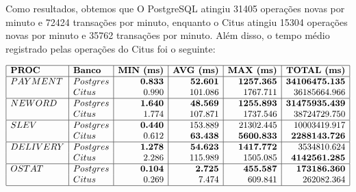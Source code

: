 Como resultados, obtemos que O PostgreSQL atingiu 31405 operações novas por minuto e 72424 transações por minuto, 
enquanto o Citus atingiu 15304 operações novas por minuto e 35762 transações por minuto.
Além disso, o tempo médio registrado pelas operações do Citus foi o seguinte:

\[
\begin{array}{|l|l|r|r|r|r|}
\hline
\textbf{PROC} & \textbf{Banco} & \textbf{MIN (ms)} & \textbf{AVG (ms)} & \textbf{MAX (ms)} & \textbf{TOTAL (ms)} \\
\hline
PAYMENT & Postgres & \textbf{0.833} & \textbf{52.601} & \textbf{1257.365} & \textbf{34106475.135} \\
        & Citus    & 0.990          & 101.086         & 1767.711          & 36185664.966         \\
\hline
NEWORD  & Postgres & \textbf{1.640} & \textbf{48.569} & \textbf{1255.893} & \textbf{31475935.439} \\
        & Citus    & 1.774          & 107.871         & 1737.546          & 38724729.750         \\
\hline
SLEV    & Postgres & \textbf{0.440} & 153.889         & 21302.445         & 10003419.917         \\
        & Citus    & 0.612          & \textbf{63.438} & \textbf{5600.833} & \textbf{2288143.726} \\
\hline
DELIVERY& Postgres & \textbf{1.278} & \textbf{54.623} & \textbf{1417.772} & 3534810.624          \\
        & Citus    & 2.286          & 115.989         & 1505.085          & \textbf{4142561.285} \\
\hline
OSTAT   & Postgres & \textbf{0.104} & \textbf{2.725}  & \textbf{455.587}  & \textbf{173186.360}  \\
        & Citus    & 0.269          & 7.474           & 609.841           & 262082.364           \\
\hline
\end{array}
\]


